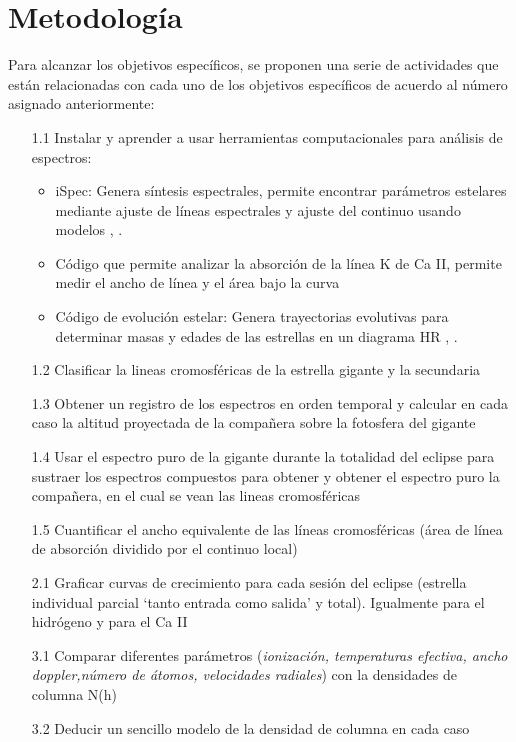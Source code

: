 \documentclass[11pt]{article}
\begin{document}

\section{Metodolog\'ia}

Para alcanzar los objetivos específicos, se proponen una serie de actividades que están relacionadas con cada uno de los objetivos específicos de acuerdo al número asignado anteriormente:

\begin{itemize}

\item[1.1] Instalar y aprender a usar herramientas computacionales para análisis de espectros:
\begin{itemize}
    \item iSpec: Genera síntesis espectrales, permite encontrar parámetros estelares mediante ajuste de líneas espectrales y ajuste del continuo usando modelos \cite{blanco2014determining}, \cite{blanco2019modern}.
    \item Código que permite analizar la absorción de la línea K de Ca II, permite medir el ancho de línea y el área bajo la curva
    \item Código de evolución estelar: Genera trayectorias evolutivas para determinar masas y edades de las estrellas en un diagrama HR \cite{pols1998stellar}, \cite{schroder1997critical}.
\end{itemize}
\item[1.2] Clasificar la lineas cromosféricas de la estrella gigante y la secundaria
\item[1.3] Obtener un registro de los espectros en orden temporal y calcular en cada caso la altitud proyectada de la compañera sobre la fotosfera del gigante

\item[1.4]  Usar el espectro puro de la gigante durante la totalidad del eclipse para sustraer los espectros compuestos para obtener y obtener el espectro puro la compañera, en el cual se vean las lineas cromosféricas

\item[1.5] Cuantificar el ancho equivalente de las líneas cromosféricas (área de línea de absorción dividido por el continuo local)

\item[2.1] Graficar curvas de crecimiento para cada sesión del eclipse (estrella individual parcial `tanto entrada como salida' y total). Igualmente para el hidrógeno y para el Ca II 

\item[3.1] Comparar diferentes parámetros (\textit{ionización, temperaturas efectiva, ancho doppler,número de átomos, velocidades radiales}) con la densidades de columna N(h)

\item[3.2] Deducir un sencillo modelo de la densidad de columna en cada caso

\end{itemize}
\end{document}
